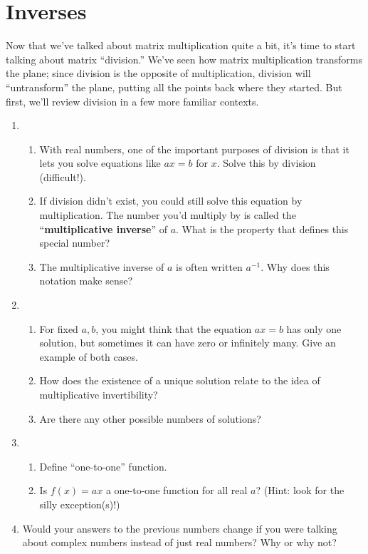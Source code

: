 \documentclass[../gatm.tex]{subfiles}
\begin{document}
\section{Inverses}
\setcounter{problem_i}{0}

\noindent Now that we've talked about matrix multiplication quite a bit, it's time to start talking about matrix ``division.'' We've seen how matrix multiplication transforms the plane; since division is the opposite of multiplication, division will ``untransform'' the plane, putting all the points back where they started. But first, we'll review division in a few more familiar contexts.

\begin{enumerate}
\setcounter{enumi}{\value{problem_i}}
\item \begin{enumerate}
\item With real numbers, one of the important purposes of division is that it lets you solve equations like $ax=b$ for $x$. Solve this by division (difficult!).
\item If division didn't exist, you could still solve this equation by multiplication. The number you'd multiply by is called the ``\textbf{multiplicative inverse}'' of $a$. What is the property that defines this special number?
\item The multiplicative inverse of $a$ is often written $a^{-1}$. Why does this notation make sense?
\end{enumerate}
\item \begin{enumerate}
\item For fixed $a,b$, you might think that the equation $ax=b$ has only one solution, but sometimes it can have zero or infinitely many. Give an example of both cases.
\item How does the existence of a unique solution relate to the idea of multiplicative invertibility?
\item Are there any other possible numbers of solutions?
\end{enumerate}
\item \begin{enumerate}
\item Define ``one-to-one'' function.
\item Is $f(x)=ax$ a one-to-one function for all real $a$? (Hint: look for the silly exception(s)!)
\end{enumerate}
\item Would your answers to the previous numbers change if you were talking about complex numbers instead of just real numbers? Why or why not?
\setcounter{problem_i}{\value{enumi}}
\end{enumerate}
\end{document}
